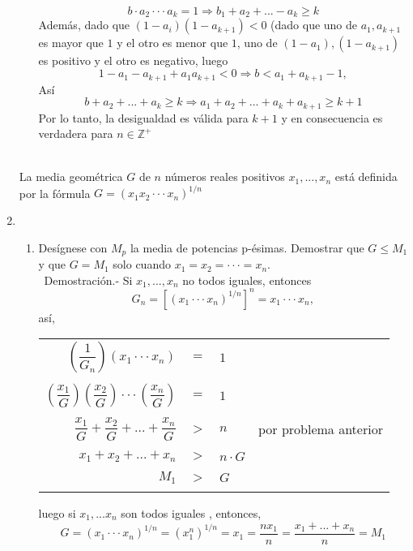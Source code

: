 \begin{enumerate}[ \bfseries 1.]
\begin{enumerate}[C1]
$$b\cdot a_2 \cdot \cdot \cdot a_k = 1 \Rightarrow b_1 + a_2 + ... - a_k \geq k$$
Además, dado que $(1-a_i)(1-a_{k+1})<0$ (dado que uno de $a_1, a_{k+1}$ es mayor que $1$ y el otro es menor que $1$, uno de $(1-a_1), (1-a_{k+1})$ es positivo y el otro es negativo, luego $$1-a_1-a_{k+1}+a_1a_{k+1}<0 \Rightarrow b<a_1 + a_{k+1}-1,$$
Así
$$b+a_2+...+a_k\geq k \Rightarrow a_1 + a_2 +...+a_k + a_{k+1} \geq k+1$$
Por lo tanto, la desigualdad es válida para $k+1$ y en consecuencia es verdadera para $n\in \mathbb{Z}^+$\\\\
\end{enumerate}

\begin{def.}
La media geométrica $G$ de $n$ números reales positivos $x_1,...,x_n$ está definida por la fórmula $G=(x_1 x_2 \cdot \cdot \cdot x_n)^{1/n}$
\end{def.}
\item 
\begin{enumerate}[\bfseries (a)]
\item Desígnese con $M_p$ la media de potencias p-ésimas. Demostrar que $G \leq M_1$ y que $G=M_1$ solo cuando $x_1 = x_2 = \cdot \cdot \cdot = x_n.$\\\
Demostración.- \; Si $x_1, ... ,x_n$ no todos iguales, entonces $$G_n = \left[ (x_1 \cdot \cdot \cdot x_n)^{1/n} \right]^n = x_1 \cdot \cdot \cdot x_n,$$ así, 
\begin{center}
\begin{tabular}{rcll}
$\left( \dfrac{1}{G_n} \right)(x_1\cdot \cdot \cdot x_n)$&$=$&$1$&\\\\
$\left( \dfrac{x_1}{G} \right) \left( \dfrac{x_2}{G} \right) \cdot \cdot \cdot \left( \dfrac{x_n}{G} \right)$&$=$&$1$&\\\\
$\dfrac{x_1}{G} + \dfrac{x_2}{G} + ... + \dfrac{x_n}{G}$&$>$&$n$& por problema anterior\\\\
$x_1+x_2+...+x_n$&$>$&$n \cdot G$\\\\
$M_1$&$>$&$G$\\\\
\end{tabular}
\end{center}
luego si $x_1,...x_n$ son todos iguales , entonces, $$G=(x_1\cdot \cdot \cdot x_n)^{1/n} = (x_1^n)^{1/n}=x_1 =  \dfrac{n x_1}{n} = \dfrac{x_1 + ... + x_n}{n} = M_1$$\\

\end{enumerate}
\end{enumerate}
